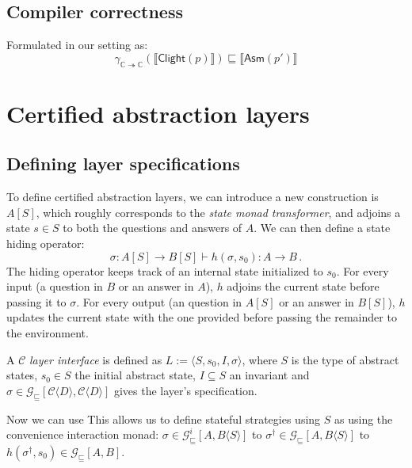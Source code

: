 \documentclass[format=sigplan,authordraft]{acmart}
\newcommand{\gcat}{\mathcal{G}_{\sqsubseteq}}
\newcommand{\kw}[1]{\ensuremath{ \mathsf{#1} }}
\begin{document}

\subsection{Compiler correctness} %

Formulated in our setting as:
\[
    \gamma_{\mathbb{C} \twoheadrightarrow \mathbb{C}}
          (\llbracket \kw{Clight}(p) \rrbracket) \sqsubseteq
    \llbracket \kw{Asm}(p') \rrbracket
\]



\section{Certified abstraction layers} %

\subsection{Defining layer specifications} %

To define certified abstraction layers,
we can introduce a new construction is $A[S]$,
which roughly corresponds to the \emph{state monad transformer},
and adjoins a state $s \in S$ to both the questions and answers of $A$.
We can then define a state hiding operator:
\[
    \sigma : A[S] \rightarrow B[S] \vdash
    h(\sigma, s_0) : A \rightarrow B \,.
\]
The hiding operator keeps track of an internal state
initialized to $s_0$.
For every input (a question in $B$ or an answer in $A$),
$h$ adjoins the current state before passing it to $\sigma$.
For every output (an question in $A[S]$ or an answer in $B[S]$),
$h$ updates the current state with the one provided
before passing the remainder to the environment.

A $\mathcal{C}$ \emph{layer interface} is defined as
$L := \langle S, s_0, I, \sigma \rangle$,
where $S$ is the type of abstract states,
$s_0 \in S$ the initial abstract state,
$I \subseteq S$ an invariant and
$\sigma \in
 \gcat[\mathcal{C}\langle D \rangle, \mathcal{C}\langle D \rangle]$
gives the layer's specification.



Now we can use 
This allows us to define stateful strategies
using $S$ as 
using the convenience interaction monad:
$\sigma \in \gcat^i[A, B \langle S \rangle]$
to $\sigma^\dagger \in \gcat[A, B \langle S \rangle]$
to $h(\sigma^\dagger, s_0) \in \gcat[A, B]$.

\end{document}
